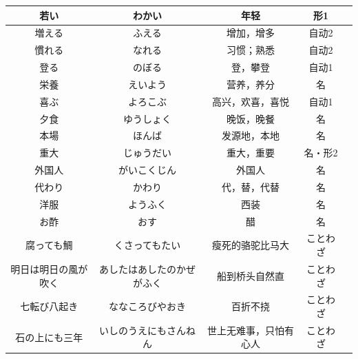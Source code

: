 \begin{longtable}{|c|c|c|c|c|}
    若い & わかい & 年轻 & 形1 & \\ \hline
    増える & ふえる & 增加，增多 & 自动2 & \\ \hline
    慣れる & なれる & 习惯；熟悉 & 自动2 & \\ \hline
    登る & のぼる & 登，攀登 & 自动1 & \\ \hline
    栄養 & えいよう & 营养，养分 & 名 & \\ \hline
    喜ぶ & よろこぶ & 高兴，欢喜，喜悦 & 自动1 & \\ \hline
    夕食 & ゆうしょく & 晚饭，晚餐 & 名 & \\ \hline
    本場 & ほんば & 发源地，本地 & 名 & \\ \hline
    重大 & じゅうだい & 重大，重要 & 名・形2 & \\ \hline
    外国人 & がいこくじん & 外国人 & 名 & \\ \hline
    代わり & かわり & 代，替，代替 & 名 & \\ \hline
    洋服 & ようふく & 西装 & 名 & \\ \hline
    お酢 & おす & 醋 & 名 & \\ \hline
    腐っても鯛 & くさってもたい & 瘦死的骆驼比马大 & ことわざ & \\ \hline
    明日は明日の風が吹く & あしたはあしたのかぜがふく & 船到桥头自然直 & ことわざ & \\ \hline
    七転び八起き & ななころびやおき & 百折不挠 & ことわざ & \\ \hline
    石の上にも三年 & いしのうえにもさんねん & 世上无难事，只怕有心人 & ことわざ & \\ \hline
\end{longtable}

